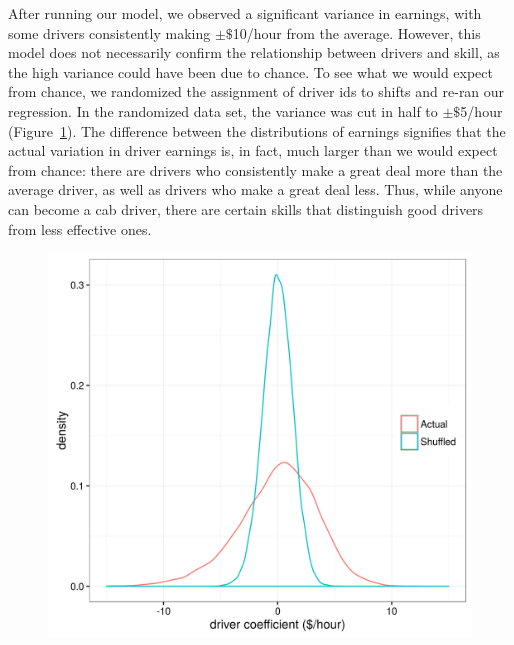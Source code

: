 \documentclass[twocolumn]{article}
\begin{document}
After running our model, we observed a significant variance in earnings, with some drivers consistently making $\pm$$\$$10/hour from the average. However, this model does not necessarily confirm the relationship between drivers and skill, as the high variance could have been due to chance. To see what we would expect from chance, we randomized the assignment of driver ids to shifts and re-ran our regression. In the randomized data set, the variance was cut in half to $\pm$$\$$5/hour (Figure~\ref{fig:efficiency}). The difference between the distributions of earnings signifies that the actual variation in driver earnings is, in fact, much larger than we would expect from chance: there are drivers who consistently make a great deal more than the average driver, as well as drivers who make a great deal less. Thus, while anyone can become a cab driver, there are certain skills that distinguish good drivers from less effective ones.
\begin{figure}[h]
  \centering
  \includegraphics[width=.9\linewidth]{efficiency}
  \label{fig:efficiency}
\end{figure}
\end{document}
